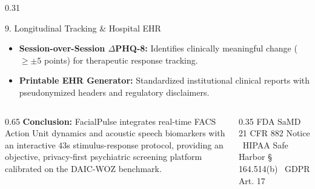 \documentclass[final]{beamer}
\begin{document}
\begin{frame}[t]
\begin{columns}[t]
\begin{column}{0.31\textwidth}
    \begin{posterbox}{9. Longitudinal Tracking \& Hospital EHR}
      \begin{itemize}
        \item \textbf{Session-over-Session $\Delta$PHQ-8:} Identifies clinically meaningful change ($\ge \pm 5$ points) for therapeutic response tracking.
        \item \textbf{Printable EHR Generator:} Standardized institutional clinical reports with pseudonymized headers and regulatory disclaimers.
      \end{itemize}
    \end{posterbox}

  \end{column}

\end{columns}

\vfill

\begin{tcolorbox}[colback=NavyBlue,colframe=NavyBlue,arc=0mm,boxrule=0pt,top=4mm,bottom=4mm,left=10mm,right=10mm]
  \begin{columns}
    \begin{column}{0.65\textwidth}
      {\scriptsize \color{BorderSlate} \textbf{Conclusion:} FacialPulse integrates real-time FACS Action Unit dynamics and acoustic speech biomarkers with an interactive 43s stimulus-response protocol, providing an objective, privacy-first psychiatric screening platform calibrated on the DAIC-WOZ benchmark.}
    \end{column}
    \begin{column}{0.35\textwidth}
      \raggedleft
      {\scriptsize \color{BorderSlate!70} FDA SaMD 21 CFR 882 Notice \textbullet\ HIPAA Safe Harbor § 164.514(b) \textbullet\ GDPR Art. 17}
    \end{column}
  \end{columns}
\end{tcolorbox}

\end{frame}
\end{document}

